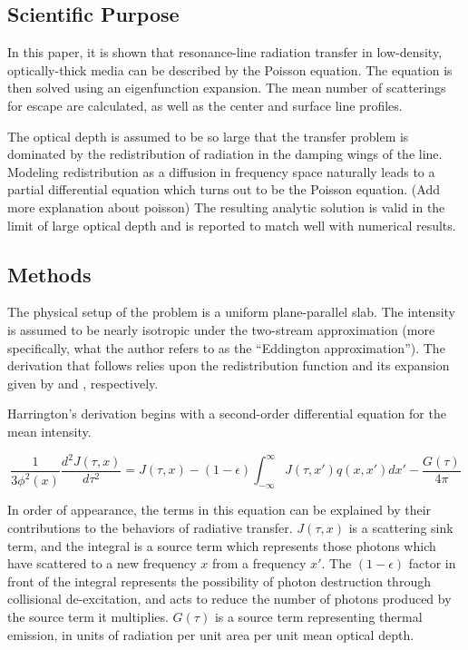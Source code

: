 \documentclass[onecolumn]{aastex63}
\begin{document}
\subsection{Scientific Purpose}
In this paper, it is shown that resonance-line radiation transfer in low-density, optically-thick media can be described by the Poisson equation. The equation is then solved using an eigenfunction expansion. The mean number of scatterings for escape are calculated, as well as the center and surface line profiles.

The optical depth is assumed to be so large that the transfer problem is dominated by the redistribution of radiation in the damping wings of the line. Modeling redistribution as a diffusion in frequency space naturally leads to a partial differential equation which turns out to be the Poisson equation. (Add more explanation about poisson) The resulting analytic solution is valid in the limit of large optical depth and is reported to match well with numerical results.

\subsection{Methods}
The physical setup of the problem is a uniform plane-parallel slab. The intensity is assumed to be nearly isotropic under the two-stream approximation (more specifically, what the author refers to as the ``Eddington approximation''). The derivation that follows relies upon the redistribution function and its expansion given by \cite{hummer1962} and \cite{1972ApJ...174..439A}, respectively. 


Harrington's derivation begins with a second-order differential equation for the mean intensity.

\begin{equation} \label{harrington1}
    \frac{1}{3\phi^2(x)}\frac{d^2J(\tau, x)}{d\tau^2} = J(\tau, x) - (1-\epsilon)\int_{-\infty}^{\infty}J(\tau, x')q(x, x')dx' - \frac{G(\tau)}{4\pi}
\end{equation}

In order of appearance, the terms in this equation can be explained by their contributions to the behaviors of radiative transfer. $J(\tau, x)$ is a scattering sink term, and the integral is a source term which represents those photons which have scattered to a new frequency $x$ from a frequency $x'$. The $(1-\epsilon)$ factor in front of the integral represents the possibility of photon destruction through collisional de-excitation, and acts to reduce the number of photons produced by the source term it multiplies. $G(\tau)$ is a source term representing thermal emission, in units of radiation per unit area per unit mean optical depth. 
\end{document}
